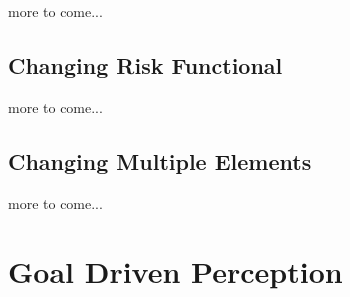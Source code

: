 \documentclass{article}
\begin{document}
more to come...

\subsection{Changing Risk Functional}

more to come...

\subsection{Changing Multiple Elements}

more to come...







\section{Goal Driven Perception}
\label{sec:perception}
\end{document}
